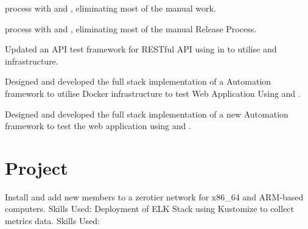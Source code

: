 \documentclass[]{resume-dark}
\begin{document}
\begin{minipage}[t]{0.66\textwidth}
\begin{tightemize}
\item {} process with  and , eliminating most of the manual work.
\item {} process with  and , eliminating most of the manual Release Process.
\item Updated an API test framework for RESTful API using  in  to utilise  and  infrastructure.
\item Designed and developed the full stack implementation of a Automation framework to utilise Docker infrastructure to test Web Application Using  and .
\end{tightemize}
\sectionsep
{}
\begin{tightemize}
\item Designed and developed the full stack implementation of a new Automation framework to test the web application using  and .
\end{tightemize}
\sectionsep


\section{Project}
Install and add new members to a zerotier network for x86\_64 and ARM-based computers.
\newline
Skills Used: 
\sectionsep
{}
Deployment of ELK Stack using Kustomize to collect metrics data.
\newline
Skills Used: 
\sectionsep



\end{minipage} 
\end{document}
